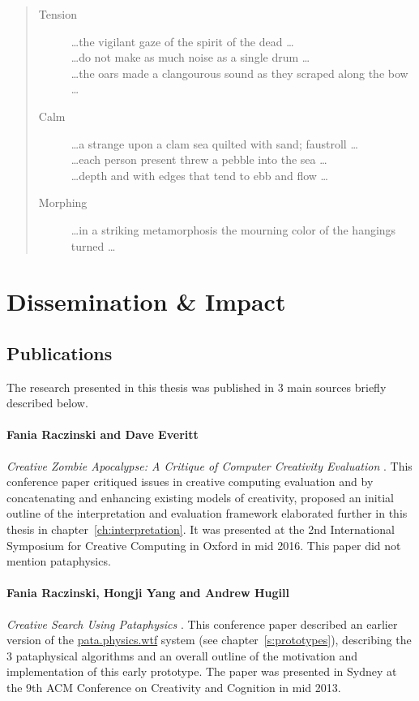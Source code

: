 \begin{quotation}
\begin{description}
  \item [Tension] \ldots the vigilant gaze of the spirit of the dead \ldots \\ \ldots do not make as much noise as a single drum \ldots \\ \ldots the oars made a clangourous sound as they scraped along the bow \ldots
  \item [Calm] \ldots a strange upon a clam sea quilted with sand; faustroll \ldots \\ \ldots each person present threw a pebble into the sea \ldots \\ \ldots depth and with edges that tend to ebb and flow \ldots 
  \item [Morphing] \ldots in a striking metamorphosis the mourning color of the hangings turned \ldots 
\end{description}
\end{quotation}


\section{Dissemination \& Impact}


\subsection{Publications}

The research presented in this thesis was published in 3 main sources briefly described below.

\paragraph{Fania Raczinski and Dave Everitt} \textit{Creative Zombie Apocalypse: A Critique of Computer Creativity Evaluation} \autocite*{Raczinski2016}. This conference paper critiqued issues in creative computing evaluation and by concatenating and enhancing existing models of creativity, proposed an initial outline of the interpretation and evaluation framework elaborated further in this thesis in chapter~\ref{ch:interpretation}. It was presented at the 2nd International Symposium for Creative Computing in Oxford in mid 2016. This paper did not mention pataphysics.

\paragraph{Fania Raczinski, Hongji Yang and Andrew Hugill} \textit{Creative Search Using Pataphysics} \autocite*{Raczinski2013}. This conference paper described an earlier version of the \url{pata.physics.wtf} system (see chapter~\ref{s:prototypes}), describing the 3 pataphysical algorithms and an overall outline of the motivation and implementation of this early prototype. The paper was presented in Sydney at the 9th ACM Conference on Creativity and Cognition in mid 2013.

